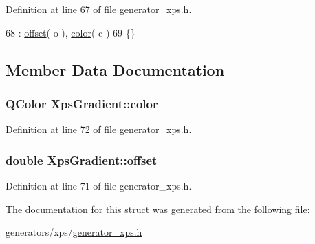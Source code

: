Definition at line 67 of file generator\+\_\+xps.\+h.


\begin{DoxyCode}
68         : \hyperlink{structXpsGradient_a2f7017cc6f1f11f43f19522d1722853c}{offset}( o ), \hyperlink{structXpsGradient_ad786012685ed1bc97a43a8cfa8adecad}{color}( c )
69     \{\}
\end{DoxyCode}


\subsection{Member Data Documentation}
\hypertarget{structXpsGradient_ad786012685ed1bc97a43a8cfa8adecad}{
\subsubsection[{color}]{\setlength{\rightskip}{0pt plus 5cm}Q\+Color Xps\+Gradient\+::color}}\label{structXpsGradient_ad786012685ed1bc97a43a8cfa8adecad}


Definition at line 72 of file generator\+\_\+xps.\+h.

\hypertarget{structXpsGradient_a2f7017cc6f1f11f43f19522d1722853c}{
\subsubsection[{offset}]{\setlength{\rightskip}{0pt plus 5cm}double Xps\+Gradient\+::offset}}\label{structXpsGradient_a2f7017cc6f1f11f43f19522d1722853c}


Definition at line 71 of file generator\+\_\+xps.\+h.



The documentation for this struct was generated from the following file\+:\begin{DoxyCompactItemize}
\item 
generators/xps/\hyperlink{generator__xps_8h}{generator\+\_\+xps.\+h}\end{DoxyCompactItemize}
